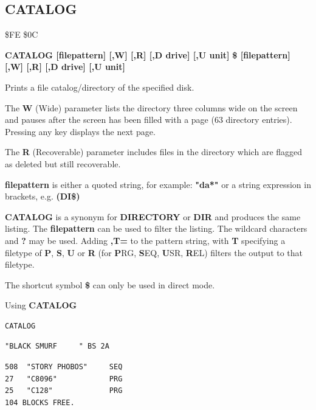 \subsection{CATALOG}
\begin{description}[leftmargin=2cm,style=nextline]
\item [Token:]  \$FE \$0C
\item [Format:] {\bf CATALOG [filepattern] [,W] [,R] [,D drive] [,U unit] }
                {\bf \$ [filepattern] [,W] [,R] [,D drive] [,U unit] }
\item [Usage:]  Prints a file catalog/directory of the specified disk.

   The {\bf W} (Wide) parameter lists the directory three columns wide
   on the screen and pauses after the screen has been filled with a page
   (63 directory entries). Pressing any key displays the next page.

   The {\bf R} (Recoverable) parameter includes files in the
   directory which are flagged as deleted but still
   recoverable.

   {\bf filepattern} is either a quoted string, for example: {\bf "da*"} or
   a string expression in brackets, e.g. {\bf (DI\$)}

   \drivedefinition

   \unitdefinition

\item [Remarks:]
   {\bf CATALOG} is a synonym for {\bf DIRECTORY}
   or {\bf DIR} and produces the same listing.
   The {\bf filepattern} can be used to filter the listing.
   The wildcard characters {\bf *} and {\bf ?} may be used.
   Adding {\bf ,T=} to the pattern string, with {\bf T} specifying
   a filetype of {\bf P}, {\bf S}, {\bf U} or {\bf R}
   (for {\bf P}RG, {\bf S}EQ, {\bf U}SR, {\bf R}EL) filters the
   output to that filetype.

   The shortcut symbol {\bf \$} can only be used in direct mode.

\item [Examples:] Using {\bf CATALOG}

\begin{tcolorbox}[colback=black,coltext=white]
\verbatimfont{\codefont}
\begin{verbatim}
CATALOG
\end{verbatim}
\selectfont{\codefont 0}
\begin{tcolorbox}[colback=white,coltext=black,arc=0mm,boxrule=0mm,
       left*=0.5mm,right*=0mm,top=0mm,bottom=0mm,nobeforeafter,
       left skip=0.5mm,
       width=28mm,height=3mm,valign=center]
\begin{verbatim}
"BLACK SMURF     " BS 2A
\end{verbatim}
\end{tcolorbox}
\begin{verbatim}
508  "STORY PHOBOS"     SEQ
27   "C8096"            PRG
25   "C128"             PRG
104 BLOCKS FREE.
\end{verbatim}
\end{tcolorbox}


\end{description}
